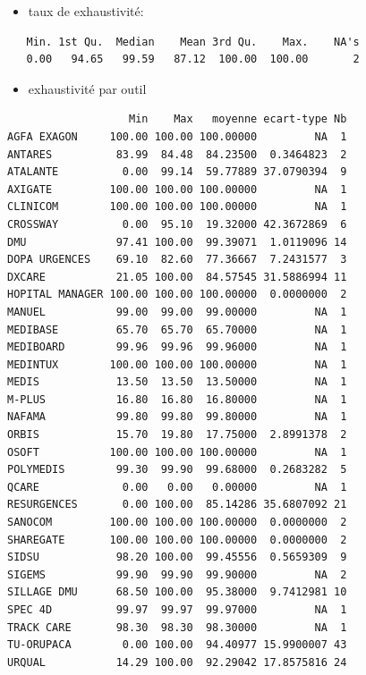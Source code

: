\documentclass[]{article}
\begin{document}
\begin{itemize}
\itemsep1pt\parskip0pt
\item
  taux de exhaustivité:
\end{itemize}

\begin{verbatim}
   Min. 1st Qu.  Median    Mean 3rd Qu.    Max.    NA's 
   0.00   94.65   99.59   87.12  100.00  100.00       2 
\end{verbatim}

\begin{itemize}
\itemsep1pt\parskip0pt
\item
  exhaustivité par outil
\end{itemize}

\begin{verbatim}
                   Min    Max   moyenne ecart-type Nb
AGFA EXAGON     100.00 100.00 100.00000         NA  1
ANTARES          83.99  84.48  84.23500  0.3464823  2
ATALANTE          0.00  99.14  59.77889 37.0790394  9
AXIGATE         100.00 100.00 100.00000         NA  1
CLINICOM        100.00 100.00 100.00000         NA  1
CROSSWAY          0.00  95.10  19.32000 42.3672869  6
DMU              97.41 100.00  99.39071  1.0119096 14
DOPA URGENCES    69.10  82.60  77.36667  7.2431577  3
DXCARE           21.05 100.00  84.57545 31.5886994 11
HOPITAL MANAGER 100.00 100.00 100.00000  0.0000000  2
MANUEL           99.00  99.00  99.00000         NA  1
MEDIBASE         65.70  65.70  65.70000         NA  1
MEDIBOARD        99.96  99.96  99.96000         NA  1
MEDINTUX        100.00 100.00 100.00000         NA  1
MEDIS            13.50  13.50  13.50000         NA  1
M-PLUS           16.80  16.80  16.80000         NA  1
NAFAMA           99.80  99.80  99.80000         NA  1
ORBIS            15.70  19.80  17.75000  2.8991378  2
OSOFT           100.00 100.00 100.00000         NA  1
POLYMEDIS        99.30  99.90  99.68000  0.2683282  5
QCARE             0.00   0.00   0.00000         NA  1
RESURGENCES       0.00 100.00  85.14286 35.6807092 21
SANOCOM         100.00 100.00 100.00000  0.0000000  2
SHAREGATE       100.00 100.00 100.00000  0.0000000  2
SIDSU            98.20 100.00  99.45556  0.5659309  9
SIGEMS           99.90  99.90  99.90000         NA  2
SILLAGE DMU      68.50 100.00  95.38000  9.7412981 10
SPEC 4D          99.97  99.97  99.97000         NA  1
TRACK CARE       98.30  98.30  98.30000         NA  1
TU-ORUPACA        0.00 100.00  94.40977 15.9900007 43
URQUAL           14.29 100.00  92.29042 17.8575816 24
\end{verbatim}
\end{document}
